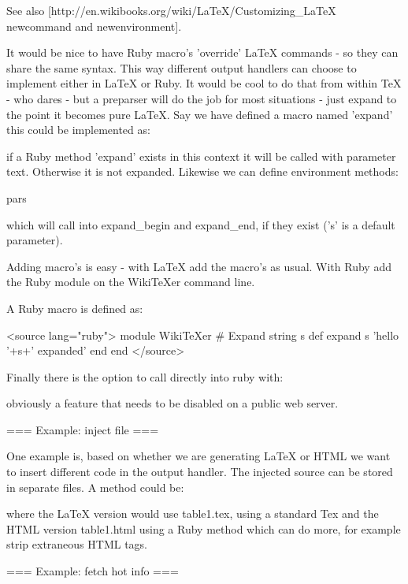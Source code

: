 See also [http://en.wikibooks.org/wiki/LaTeX/Customizing_LaTeX newcommand and newenvironment].

It would be nice to have Ruby macro's 'override' LaTeX commands - so
they can share the same syntax. This way different output handlers can
choose to implement either in LaTeX or Ruby. It would be cool to do
that from within TeX - who dares - but a preparser will do the job for
most situations - just expand to the point it becomes pure LaTeX. Say
we have defined a macro named 'expand' this could be implemented as:


if a Ruby method 'expand' exists in this context it will be called
with parameter text. Otherwise it is not expanded. Likewise we can 
define environment methods:

  \begin{expand}[s]{pars}
	\end{expand}

which will call into expand_begin and expand_end, if they exist ('s'
is a default parameter).

Adding macro's is easy - with LaTeX add the macro's as usual. With
Ruby add the Ruby module on the WikiTeXer command line.

A Ruby macro is defined as:

<source lang="ruby">
  module WikiTeXer
		# Expand string s
		def expand s
			'hello '+s+' expanded'
		end
	end
</source>

Finally there is the option to call directly into ruby with:


obviously a feature that needs to be disabled on a public web server.

=== Example: inject file ===
  
One example is, based on whether we are generating LaTeX or HTML we
want to insert different code in the output handler. The injected
source can be stored in separate files. A method could be:


where the LaTeX version would use table1.tex, using a standard Tex
 and the HTML version table1.html using a Ruby method
which can do more, for example strip extraneous HTML tags.

=== Example: fetch hot info ===

